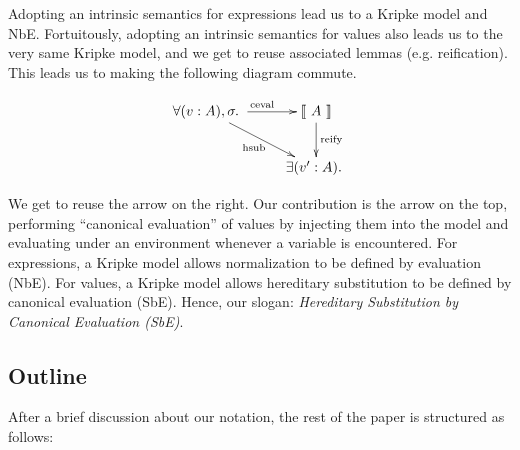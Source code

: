 \documentclass[preprint,nonatbib]{sigplanconf}
\numberwithin{subdefin}{defin}
\numberwithin{subtheorem}{theorem}
\newcommand{\ascribe}[2]{(#1 : #2)}
\newcommand{\all}[1]{\forall#1.~}
\newcommand{\ex}[1]{\exists#1.~}
\newcommand{\el}[1]{\llbracket ~ #1 ~ \rrbracket}
\newcommand{\fun}[1]{\textmd{#1}}
\begin{document}
Adopting an intrinsic semantics for expressions lead us to a Kripke
model and NbE. Fortuitously, adopting an intrinsic semantics for
values also leads us to the very same Kripke model, and we get to
reuse associated lemmas (e.g. reification). This leads us to making
the following diagram commute.

\begin{displaymath}
    \xymatrix{
          \all{\ascribe{v}{A}, \sigma}
          \ar[dr]_{\fun{hsub}}
          \ar[r]^{\fun{ceval}}
        & {\el{A}}
          \ar[d]^{\large{\fun{reify}}}
\\      & \ex{\ascribe{v'}{A}} }
\end{displaymath}

We get to reuse the arrow on the right. Our contribution is the arrow
on the top, performing ``canonical evaluation'' of values by injecting
them into the model and evaluating under an environment whenever a
variable is encountered. For expressions, a Kripke model allows
normalization to be defined by evaluation (NbE). For values, a Kripke
model allows hereditary substitution to be defined by canonical
evaluation (SbE). Hence, our slogan:
{\it Hereditary Substitution by Canonical Evaluation (SbE)}.

\subsection{Outline}

After a brief discussion about our notation, the rest of the paper is
structured as follows:
\end{document}
